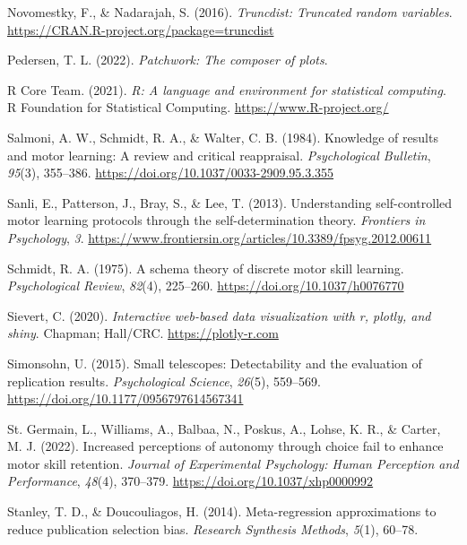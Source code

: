 \documentclass[
  doc, donotrepeattitle,floatsintext]{apa7}
\newlength{\cslhangindent}
\newlength{\cslentryspacingunit} %
\newenvironment{CSLReferences}[2] %
 {%
  \setlength{\parindent}{0pt}
  \ifodd #1
  \let\oldpar\par
  \def\par{\hangindent=\cslhangindent\oldpar}
  \fi
  \setlength{\parskip}{#2\cslentryspacingunit}
 }%
 {}
\begin{document}
\begin{CSLReferences}{1}{0}
\leavevmode{}%
Novomestky, F., \& Nadarajah, S. (2016). \emph{Truncdist: Truncated random variables}. \url{https://CRAN.R-project.org/package=truncdist}

\leavevmode{}%
Pedersen, T. L. (2022). \emph{Patchwork: The composer of plots}.

\leavevmode{}%
R Core Team. (2021). \emph{R: A language and environment for statistical computing}. R Foundation for Statistical Computing. \url{https://www.R-project.org/}

\leavevmode{}%
Salmoni, A. W., Schmidt, R. A., \& Walter, C. B. (1984). Knowledge of results and motor learning: A review and critical reappraisal. \emph{Psychological Bulletin}, \emph{95}(3), 355--386. \url{https://doi.org/10.1037/0033-2909.95.3.355}

\leavevmode{}%
Sanli, E., Patterson, J., Bray, S., \& Lee, T. (2013). Understanding self-controlled motor learning protocols through the self-determination theory. \emph{Frontiers in Psychology}, \emph{3}. \url{https://www.frontiersin.org/articles/10.3389/fpsyg.2012.00611}

\leavevmode{}%
Schmidt, R. A. (1975). A schema theory of discrete motor skill learning. \emph{Psychological Review}, \emph{82}(4), 225--260. \url{https://doi.org/10.1037/h0076770}

\leavevmode{}%
Sievert, C. (2020). \emph{Interactive web-based data visualization with r, plotly, and shiny}. Chapman; Hall/CRC. \url{https://plotly-r.com}

\leavevmode{}%
Simonsohn, U. (2015). Small telescopes: Detectability and the evaluation of replication results. \emph{Psychological Science}, \emph{26}(5), 559--569. \url{https://doi.org/10.1177/0956797614567341}

\leavevmode{}%
St. Germain, L., Williams, A., Balbaa, N., Poskus, A., Lohse, K. R., \& Carter, M. J. (2022). Increased perceptions of autonomy through choice fail to enhance motor skill retention. \emph{Journal of Experimental Psychology: Human Perception and Performance}, \emph{48}(4), 370--379. \url{https://doi.org/10.1037/xhp0000992}

\leavevmode{}%
Stanley, T. D., \& Doucouliagos, H. (2014). Meta-regression approximations to reduce publication selection bias. \emph{Research Synthesis Methods}, \emph{5}(1), 60--78.


\end{CSLReferences}
\end{document}
